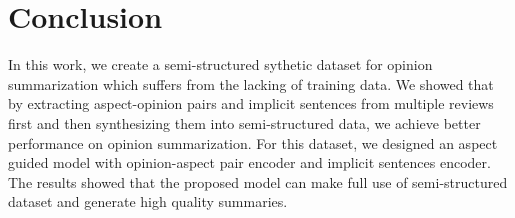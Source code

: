 \section{Conclusion}
\label{sec:conclude}
In this work,
we create a semi-structured sythetic dataset for opinion summarization
which suffers from the lacking of training data.
We showed that by extracting aspect-opinion pairs and implicit sentences from multiple reviews
first and then synthesizing
them into semi-structured data, we achieve
better performance on opinion summarization.
For this dataset, 
we designed an aspect guided model with opinion-aspect pair encoder and implicit sentences encoder.
The results showed that
the proposed model can make full use of semi-structured dataset
and generate high quality summaries.


